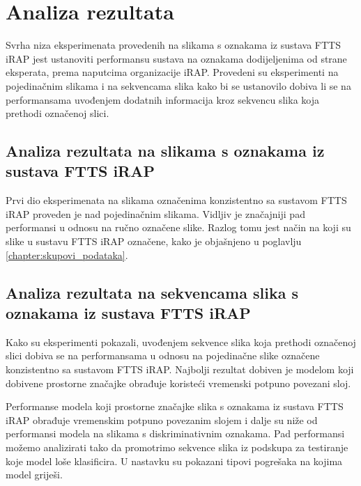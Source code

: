 \documentclass[times, utf8, diplomski, numeric]{fer}
\begin{document}
\section{Analiza rezultata}
Svrha niza eksperimenata provedenih na slikama s oznakama iz sustava FTTS iRAP jest ustanoviti performansu sustava na oznakama dodijeljenima od strane eksperata, prema naputcima organizacije iRAP.
Provedeni su eksperimenti na pojedinačnim slikama i na sekvencama slika kako bi se ustanovilo dobiva li se na performansama uvođenjem dodatnih informacija kroz sekvencu slika koja prethodi označenoj slici.

\subsection{Analiza rezultata na slikama s oznakama iz sustava FTTS iRAP}
Prvi dio eksperimenata na slikama označenima konzistentno sa sustavom FTTS iRAP proveden je nad pojedinačnim slikama. 
Vidljiv je značajniji pad performansi u odnosu na ručno označene slike. 
Razlog tomu jest način na koji su slike u sustavu FTTS iRAP označene, kako je objašnjeno u poglavlju \ref{chapter:skupovi_podataka}.

\subsection{Analiza rezultata na sekvencama slika s oznakama iz sustava FTTS iRAP}
Kako su eksperimenti pokazali, uvođenjem sekvence slika koja prethodi označenoj slici dobiva se na performansama u odnosu na pojedinačne slike označene konzistentno sa sustavom FTTS iRAP. 
Najbolji rezultat dobiven je modelom koji dobivene prostorne značajke obrađuje koristeći vremenski potpuno povezani sloj.

Performanse modela koji prostorne značajke slika s oznakama iz sustava FTTS iRAP obrađuje vremenskim potpuno povezanim slojem i dalje su niže od performansi modela na slikama s diskriminativnim oznakama.
Pad performansi možemo analizirati tako da promotrimo sekvence slika iz podskupa za testiranje koje model loše klasificira. 
U nastavku su pokazani tipovi pogrešaka na kojima model griješi.
\end{document}
